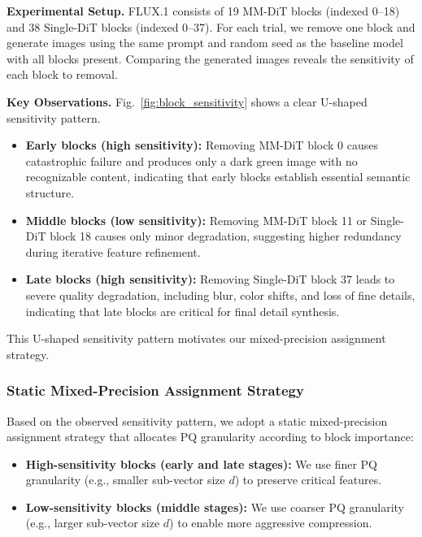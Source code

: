 \textbf{Experimental Setup.} FLUX.1 consists of 19 MM-DiT blocks (indexed 0--18) and 38 Single-DiT blocks (indexed 0--37). For each trial, we remove one block and generate images using the same prompt and random seed as the baseline model with all blocks present. Comparing the generated images reveals the sensitivity of each block to removal.

\textbf{Key Observations.} Fig.~\ref{fig:block_sensitivity} shows a clear U-shaped sensitivity pattern.

\begin{itemize}
    \item \textbf{Early blocks (high sensitivity):} Removing MM-DiT block 0 causes catastrophic failure and produces only a dark green image with no recognizable content, indicating that early blocks establish essential semantic structure.
    
    \item \textbf{Middle blocks (low sensitivity):} Removing MM-DiT block 11 or Single-DiT block 18 causes only minor degradation, suggesting higher redundancy during iterative feature refinement.
    
    \item \textbf{Late blocks (high sensitivity):} Removing Single-DiT block 37 leads to severe quality degradation, including blur, color shifts, and loss of fine details, indicating that late blocks are critical for final detail synthesis.
\end{itemize}

This U-shaped sensitivity pattern motivates our mixed-precision assignment strategy.

\subsubsection{Static Mixed-Precision Assignment Strategy}

Based on the observed sensitivity pattern, we adopt a static mixed-precision assignment strategy that allocates PQ granularity according to block importance:

\begin{itemize}
    \item \textbf{High-sensitivity blocks (early and late stages):} We use finer PQ granularity (e.g., smaller sub-vector size $d$) to preserve critical features.
    
    \item \textbf{Low-sensitivity blocks (middle stages):} We use coarser PQ granularity (e.g., larger sub-vector size $d$) to enable more aggressive compression.
\end{itemize}


